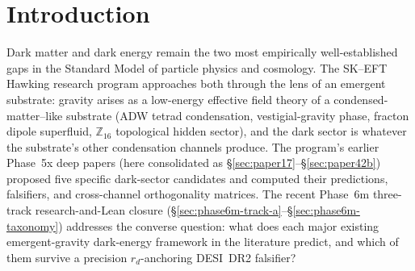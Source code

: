 \documentclass[aps,prd,reprint,nofootinbib,superscriptaddress]{revtex4-2}
\begin{document}
\begin{abstract}
Honesty discipline: load-bearing claims separate \emph{derived}
(Lean-formalized non-trivial mathematical content) from \emph{machine-checked
classification (MCC)} (consistency-of-author-classification verification)
from \emph{heuristic / empirical}; the explicit MCC label is used
throughout. The bundle ships at $\bundleTheorems$ Lean theorems across
$\bundleModules$ modules with zero active sorry and zero project-local
axioms (the formerly-tracked gapped-interface statement is now the
tracked Prop \texttt{TPFConjecture}).

\end{abstract}

\maketitle


\section{Introduction}
\label{sec:intro}

Dark matter and dark energy remain the two most empirically well-established
gaps in the Standard Model of particle physics and cosmology. The SK--EFT
Hawking research program approaches both through the lens of an emergent
substrate: gravity arises as a low-energy effective field theory of a
condensed-matter--like substrate (ADW tetrad condensation, vestigial-gravity
phase, fracton dipole superfluid, $\mathbb{Z}_{16}$ topological hidden
sector), and the dark sector is whatever the substrate's other condensation
channels produce. The program's earlier Phase~5x deep papers (here
consolidated as \S\ref{sec:paper17}--\S\ref{sec:paper42b}) proposed five
specific dark-sector candidates and computed their predictions, falsifiers,
and cross-channel orthogonality matrices. The recent Phase~6m three-track
research-and-Lean closure (\S\ref{sec:phase6m-track-a}--\S\ref{sec:phase6m-taxonomy})
addresses the converse question: what does each major existing
emergent-gravity dark-energy framework in the literature predict, and
which of them survive a precision $r_d$-anchoring DESI~DR2 falsifier?
\end{document}
